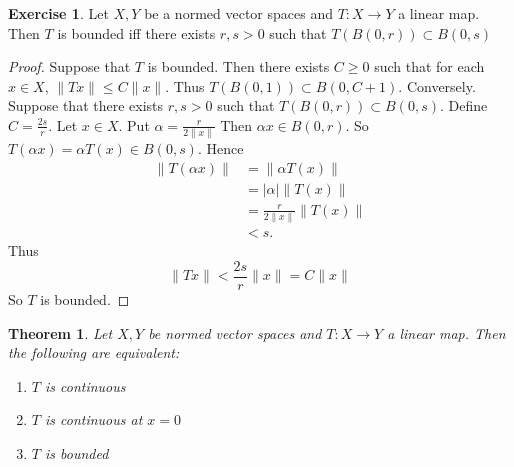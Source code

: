 \documentclass[12pt]{amsart}
\newtheorem{thm}{Theorem}[subsection]
\theoremstyle{definition}
\theoremstyle{remark}
\theoremstyle{definition}
\newtheorem{ex}[definition]{Exercise}
\newcommand{\al}{\alpha}
\begin{document}
	\begin{ex}
		Let $X,Y$ be a normed vector spaces and $T:X \rightarrow Y$ a linear map. Then $T$ is bounded iff there exists $r,s>0$ such that $T(B(0,r)) \subset B(0,s)$
	\end{ex}
	
	\begin{proof}
		Suppose that $T$ is bounded. Then there exists $C \geq 0$ such that for each $x \in X$, $\|Tx \|\leq C \|x \|$. Thus $T(B(0,1)) \subset B(0,C+1)$. Conversely. Suppose that there exists $r,s >0$ such that $T(B(0,r)) \subset B(0,s)$. Define $C = \frac{2s}{r}$. Let $x \in X$. Put $\al = \frac{r}{2\|x \|}$ Then $\al x \in B(0,r)$. So $T(\al x ) = \al T(x) \in B(0,s)$. Hence 
		\begin{align*}
			\|T(\al x) \|
			&= \|\al T(x) \|\\
			&= \vert \al \vert \|T(x) \|\\
			& = \frac{r}{2 \|x \|}  \|T(x) \|\\
			& < s.
		\end{align*}
		Thus $$\|Tx \|< \frac{2 s}{r} \|x \|= C \|x \|$$ So $T$ is bounded. 
	\end{proof}
	
	\begin{thm}
		Let $X,Y$ be normed vector spaces and $T:X \rightarrow Y$ a linear map. Then the following are equivalent:
		\begin{enumerate}
			\item $T$ is continuous
			\item $T$ is continuous at $x=0$
			\item $T$ is bounded
		\end{enumerate}
	\end{thm}
	
\end{document}
